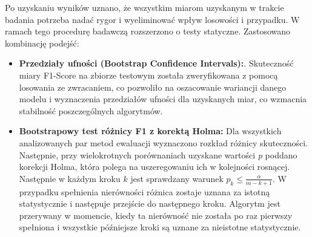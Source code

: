 \documentclass[a4paper,twoside,12pt]{book}
\begin{document}
	Po uzyskaniu wyników uznano, że wszystkim miarom uzyskanym w trakcie badania potrzeba nadać rygor i wyeliminować wpływ losowości i przypadku. W ramach tego procedurę badawczą rozszerzono o testy statyczne. Zastosowano kombinację podejść:
	\begin{itemize}
		\item \textbf{Przedziały ufności (Bootstrap Confidence Intervals):}. Skuteczność miary F1-Score na zbiorze testowym została zweryfikowana z pomocą losowania ze zwracaniem, co pozwoliło na oszacowanie wariancji danego modelu i wyznaczenia przedziałów ufności dla uzyskanych miar, co wzmacnia stabilność poszczególnych algorytmów.
		\item \textbf{Bootstrapowy test różnicy F1 z korektą Holma:} Dla wszystkich  analizowanych par metod ewaluacji wyznaczono rozkład różnicy skuteczności. Następnie, przy wielokrotnych porównaniach uzyskane wartości \textit{p} poddano korekcji Holma, która polega na uszeregowaniu ich w kolejności rosnącej. Następnie w każdym kroku $k$ jest sprawdzany warunek $p_k \leq \frac{\alpha}{m - k + 1}$. W przypadku spełnienia nierówności różnica zostaje uznana za istotną statystycznie i następuje przejście do następnego kroku. Algorytm jest przerywany w momencie, kiedy ta nierówność nie została po raz pierwszy spełniona i wszystkie późniejsze kroki są uznane za nieistotne statystycznie.
	\end{itemize}
	
	
\end{document}
